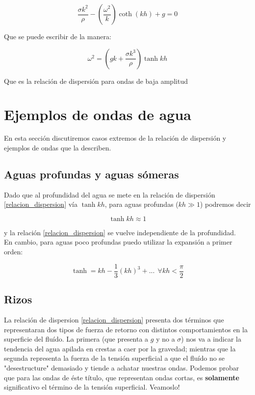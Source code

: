 \documentclass[a4paper,spanish]{article}
\numberwithin{equation}{section}
\begin{document}
\[ \frac{\sigma k^2}{\rho} - \left(\frac{\omega ^2}{k} \right) \coth (kh) + g = 0\]

Que se puede escribir de la manera:

\begin{equation}
\omega ^2 = \left( gk + \frac{\sigma k^3}{\rho} \right)\tanh {kh}
\label{relacion_dispersion}
\end{equation}

Que es la relaci\'on de dispersi\'on para ondas de baja amplitud

\section{Ejemplos de ondas de agua}
En esta secci\'on discutiremos casos extremos de la relaci\'on de dispersi\'on y ejemplos de ondas que la describen.

\subsection*{Aguas profundas y aguas s\'omeras}
Dado que al profundidad del agua se mete en la relaci\'on de dispersi\'on \ref{relacion_dispersion} v\'ia $\tanh {kh}$, para aguas profundas ($kh \gg 1$) podremos decir

\[ \tanh {kh} \approx 1\]

y la relaci\'on \ref{relacion_dispersion} se vuelve independiente de la profundidad.\\
En cambio, para aguas poco profundas puedo utilizar la expansi\'on a primer orden:

\[\tanh = kh - \frac{1}{3}(kh)^3 + ...  \ \ \forall kh< \frac{\pi}{2}\]

\subsection{Rizos}

La relaci\'on de dispersion \ref{relacion_dispersion} presenta dos t\'erminos que representaran dos tipos de fuerza de retorno con distintos comportamientos en la superficie del flu\'ido. La primera (que presenta a $g$ y no a $\sigma$) nos va a indicar la tendencia del agua apilada en crestas a caer por la gravedad; mientras que la segunda representa la fuerza de la tensi\'on superficial a que el flu\'ido no se "desestructure" demasiado y tiende a achatar nuestras ondas. Podemos probar que para las ondas de \'este t\'itulo, que representan ondas cortas, es \textbf{solamente} significativo el t\'ermino de la tensi\'on superficial. Veamoslo!
\end{document}
